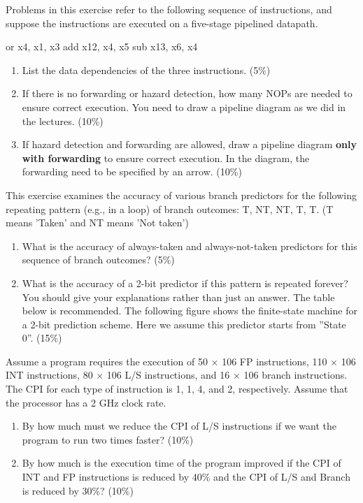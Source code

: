 \documentclass[12pt, a4paper]{article}
\begin{document}
\begin{q}{25}
    Problems in this exercise refer to the following sequence of instructions, and suppose the
instructions are executed on a five-stage pipelined datapath.
\begin{code}
    or x4, x1, x3
    add x12, x4, x5
    sub x13, x6, x4
\end{code}
\begin{enumerate}
    \item List the data dependencies of the three instructions. (5\%)
    \item If there is no forwarding or hazard detection, how many NOPs are needed to ensure correct execution. You need to draw a pipeline diagram as we did in the lectures. (10\%)
    \item If hazard detection and forwarding are allowed, draw a pipeline diagram \textbf{only with forwarding} to ensure correct execution. In the diagram, the forwarding need to be specified by an arrow. (10\%)
\end{enumerate}
\end{q}
\begin{ans}
    
\end{ans}
\pagebreak

\begin{q}{20}
    This exercise examines the accuracy of various branch predictors for the following repeating pattern (e.g., in a loop) of branch outcomes: T, NT, NT, T, T. (T means ’Taken’ and NT means ’Not taken’)
    \begin{enumerate}
        \item What is the accuracy of always-taken and always-not-taken predictors for this sequence of branch outcomes? (5\%)
        \item What is the accuracy of a 2-bit predictor if this pattern is repeated forever? You should give your explanations rather than just an answer. The table below is recommended. The following figure shows the finite-state machine for a 2-bit prediction scheme. Here we assume this predictor starts from ”State 0”. (15\%)
    \end{enumerate}
\end{q}
\begin{ans}
    
\end{ans}
\pagebreak

\begin{q}{20}
    Assume a program requires the execution of 50 × 106 FP instructions, 110 × 106 INT instructions, 80 × 106 L/S instructions, and 16 × 106 branch instructions. The CPI for each type of instruction is 1, 1, 4, and 2, respectively. Assume that the processor has a 2 GHz clock rate. 
    \begin{enumerate}
        \item By how much must we reduce the CPI of L/S instructions if we want the program to run two times faster? (10\%)
        \item By how much is the execution time of the program improved if the CPI of INT and FP instructions is reduced by 40\% and the CPI of L/S and Branch is reduced by 30\%? (10\%)
    \end{enumerate}
\end{q}
\end{document}
